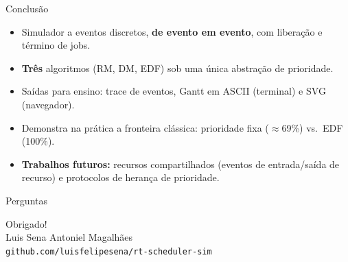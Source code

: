 \documentclass[aspectratio=169,xcolor=table]{beamer}
\begin{document}
\begin{frame}{Conclusão}
    \begin{itemize}
        \item Simulador a eventos discretos, \textbf{de evento em evento}, com liberação e término de jobs.
        \item \textbf{Três} algoritmos (RM, DM, EDF) sob uma única abstração de prioridade.
        \item Saídas para ensino: trace de eventos, Gantt em ASCII (terminal) e SVG (navegador).
        \item Demonstra na prática a fronteira clássica: prioridade fixa ($\approx$69\%) vs.\ EDF (100\%).
        \item \textbf{Trabalhos futuros:} recursos compartilhados (eventos de entrada/saída de recurso) e protocolos de herança de prioridade.
    \end{itemize}
\end{frame}

\begin{frame}{Perguntas}
    \begin{center}
        \Huge Obrigado!\\[0.6em]
        \normalsize Luis Sena \quad\textbar\quad Antoniel Magalhães\\[0.4em]
        \small \texttt{github.com/luisfelipesena/rt-scheduler-sim}
    \end{center}
\end{frame}
\end{document}
